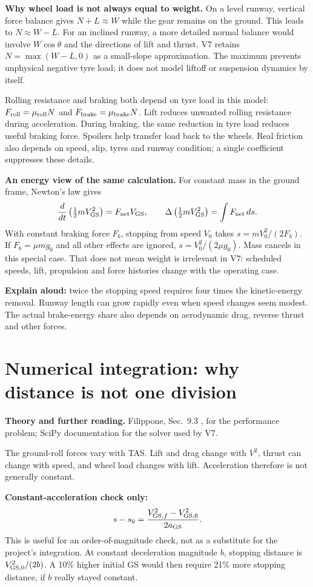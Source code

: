 \documentclass[11pt,letterpaper]{article}
\newcommand{\topic}[1]{\clearpage\section{#1}}
\newcommand{\reading}[1]{{\small\color{navy}\textbf{Theory and further reading.} #1\par}\vspace{3pt}}
\begin{document}
\textbf{Why wheel load is not always equal to weight.}
On a level runway, vertical force balance gives $N+L\approx W$ while the gear
remains on the ground. This leads to $N\approx W-L$. For an inclined runway,
a more detailed normal balance would involve $W\cos\theta$ and the directions
of lift and thrust. V7 retains $N=\max(W-L,0)$ as a small-slope approximation.
The maximum prevents unphysical negative tyre load; it does not model liftoff
or suspension dynamics by itself.

Rolling resistance and braking both depend on tyre load in this model:
$F_{\rm roll}=\mu_{\rm roll}N$ and $F_{\rm brake}=\mu_{\rm brake}N$.
Lift reduces unwanted rolling resistance during acceleration. During braking,
the same reduction in tyre load reduces useful braking force. Spoilers help
transfer load back to the wheels. Real friction also depends on speed, slip,
tyres and runway condition; a single coefficient suppresses these details.

\textbf{An energy view of the same calculation.}
For constant mass in the ground frame, Newton's law gives
\[
\frac{d}{dt}\left(\tfrac12 mV_{\rm GS}^2\right)
=F_{\rm net}V_{\rm GS},\qquad
\Delta\left(\tfrac12mV_{\rm GS}^2\right)=\int F_{\rm net}\,ds.
\]
With constant braking force $F_b$, stopping from speed $V_0$ takes
$s=mV_0^2/(2F_b)$. If $F_b=\mu mg_0$ and all other effects are ignored,
$s=V_0^2/(2\mu g_0)$. Mass cancels in this special case. That does not mean
weight is irrelevant in V7: scheduled speeds, lift, propulsion and force
histories change with the operating case.

\begin{keyidea}
\textbf{Explain aloud:} twice the stopping speed requires four times the
kinetic-energy removal. Runway length can grow rapidly even when speed changes
seem modest. The actual brake-energy share also depends on aerodynamic drag,
reverse thrust and other forces.
\end{keyidea}

\topic{Numerical integration: why distance is not one division}
\reading{Filippone, Sec.~9.3 \cite{filippone}, for the performance problem; SciPy documentation \cite{scipy-ivp} for the solver used by V7.}
The ground-roll forces vary with TAS. Lift and drag change with $V^2$, thrust can
change with speed, and wheel load changes with lift. Acceleration therefore is
not generally constant.

\textbf{Constant-acceleration check only:}
\[
s-s_0=\frac{V_{{\rm GS},f}^2-V_{{\rm GS},0}^2}{2a_{\rm GS}}.
\]
This is useful for an order-of-magnitude check, not as a substitute for the
project's integration. At constant deceleration magnitude $b$, stopping distance
is $V_{{\rm GS},0}^2/(2b)$. A 10\% higher initial GS would then require 21\% more
stopping distance, if $b$ really stayed constant.
\end{document}
